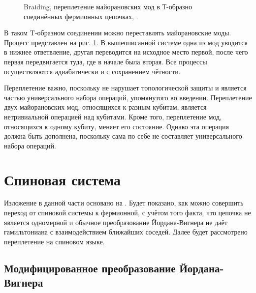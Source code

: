 \documentclass[a4paper,12pt]{article}
\theoremstyle{plain} %
\theoremstyle{definition} %
\theoremstyle{remark} %
\begin{document}
\begin{figure}
    \centering
    \caption{Braiding, переплетение майорановских мод в Т-образно соединённых фермионных цепочках, \cite{braiding}.}
    \label{fig:braiding}
\end{figure}

В таком T-\hspace{0pt}образном соединении можно переставлять майорановские моды. Процесс представлен на рис. \ref{fig:braiding}. В вышеописанной системе одна из мод уводится в нижнее ответвление, другая переводится на исходное место первой, после чего первая передвигается туда, где в начале была вторая. Все процессы осуществляются адиабатически и с сохранением чётности.

Переплетение важно, поскольку не нарушает топологической защиты и является частью универсального набора операций, упомянутого во введении. Переплетение двух майорановских мод, относящихся к разным кубитам, является нетривиальной операцией над кубитами. Кроме того, переплетение мод, относящихся к одному кубиту, меняет его состояние. Однако эта операция должна быть дополнена, поскольку сама по себе не составляет универсального набора операций.


\pagebreak

\section{Спиновая система} \label{sec:spin_system}

Изложение в данной части основано на \cite{main}. Будет показано, как можно совершить переход от спиновой системы к фермионной, с учётом того факта, что цепочка не является одномерной и обычное преобразование Йордана-Вигнера не даёт гамильтониана с взаимодействием ближайших соседей. Далее будет рассмотрено переплетение на спиновом языке.

\subsection{Модифицированное преобразование Йордана-Вигнера}
\end{document}
